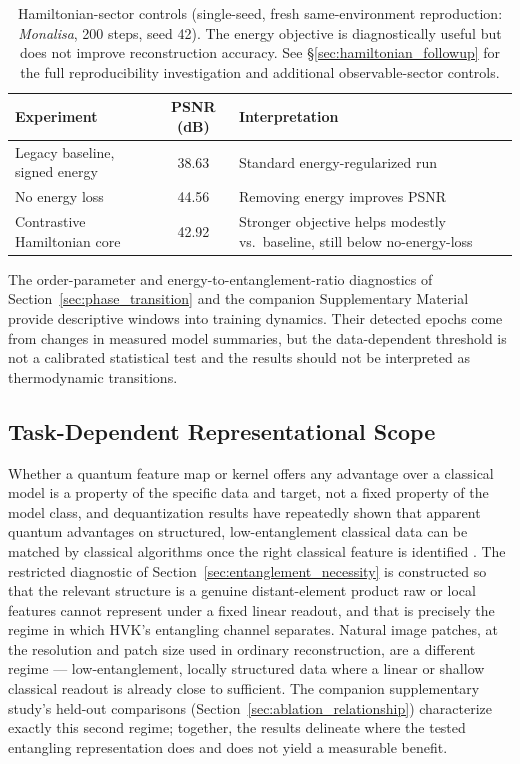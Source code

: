 \documentclass[11pt]{article}
\begin{document}
\begin{table}[t]
\centering
\caption{Hamiltonian-sector controls (single-seed, fresh same-environment reproduction: \textit{Monalisa}, 200 steps, seed 42). The energy objective is diagnostically useful but does not improve reconstruction accuracy. See \S\ref{sec:hamiltonian_followup} for the full reproducibility investigation and additional observable-sector controls.}
\label{tab:hamiltonian_controls}
\scriptsize
\begin{tabular}{p{}cp{}}
\toprule
Experiment & PSNR (dB) & Interpretation \\
\midrule
Legacy baseline, signed energy & 38.63 & Standard energy-regularized run \\
No energy loss & 44.56 & Removing energy improves PSNR \\
Contrastive Hamiltonian core & 42.92 & Stronger objective helps modestly vs.\ baseline, still below no-energy-loss \\
\bottomrule
\end{tabular}
\end{table}

The order-parameter and energy-to-entanglement-ratio diagnostics of Section~\ref{sec:phase_transition} and the companion Supplementary Material provide descriptive windows into training dynamics. Their detected epochs come from changes in measured model summaries, but the data-dependent threshold is not a calibrated statistical test and the results should not be interpreted as thermodynamic transitions.

\subsection{Task-Dependent Representational Scope}
\label{sec:dequant}
Whether a quantum feature map or kernel offers any advantage over a classical model is a property of the specific data and target, not a fixed property of the model class, and dequantization results have repeatedly shown that apparent quantum advantages on structured, low-entanglement classical data can be matched by classical algorithms once the right classical feature is identified \cite{Huang2021PowerData}. The restricted diagnostic of Section~\ref{sec:entanglement_necessity} is constructed so that the relevant structure is a genuine distant-element product raw or local features cannot represent under a fixed linear readout, and that is precisely the regime in which HVK's entangling channel separates. Natural image patches, at the resolution and patch size used in ordinary reconstruction, are a different regime --- low-entanglement, locally structured data where a linear or shallow classical readout is already close to sufficient. The companion supplementary study's held-out comparisons (Section~\ref{sec:ablation_relationship}) characterize exactly this second regime; together, the results delineate where the tested entangling representation does and does not yield a measurable benefit.
\end{document}
